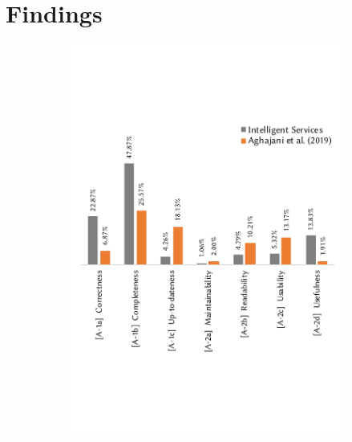 \section{Findings}
\label{icse2020:sec:findings}

\begin{figure}[t]
  \centering
  \begin{subfigure}[c]{0.49\linewidth}
    \centering
    \includegraphics[width=\linewidth]{a-compare.pdf}
  \end{subfigure}
  \hfill
  \begin{subfigure}[c]{0.49\linewidth}
    \centering

\end{subfigure}
\end{figure}
